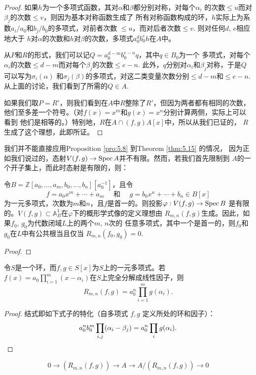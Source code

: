 \begin{proof}
如果$h$为一个多项式函数，其对$\alpha$和$\beta$都分别对称，对每个$\alpha_i$
的次数$\leq u$而对$\beta_j$的次数$\leq v$，则因为基本对称函数生成了
所有对称函数构成的环，$h$实际上为系数$a_i/a_0$和$b_j/b_0$的多项式，对前者次数
$\leq u$，而对后者次数$\leq v$. 则对任何$d$, $e$相应地大于
$h$对$\alpha$的次数和$h$对$\beta$的次数，多项式$a_0^db_0^e h$在$A$中。

从$P$和$R$的形式，我们可以记$Q=a_0^{d-m} b_0^{e-n} q$，其中$q\in B_0$为一个
多项式，对每个$\alpha_i$的次数$\leq d-m$而对每个$\beta_j$的次数$\leq e-n$. 
此外，$q$分别对$\alpha_i$和$\beta_j$对称，于是$Q$可以写为$\sigma_i(\alpha)$
和$\sigma_j(\beta)$的多项式，对这二类变量次数分别$\leq d-m$和$\leq e-n$.
从上面的讨论，我们看到了所需的$Q\in A$.

如果我们取$P=R'$，则我们看到在$A$中$R$整除了$R'$，但因为两者都有相同的次数，
他们至多差一个符号。（对$f(x)=x^m$和$g(x)=x^n$分别计算两侧，实际上可以看到
他们是相等的。）特别地，$R$在$A \cap(f, g) A[x]$中，所以从我们已证的，
$R$生成了这个理想，此即所证。
\end{proof}

我们并不能直接应用Proposition \ref{pro:5.8} 到Theorem \ref{thm:5.15} 的情况，
因为正如我们说过的，态射$V(f,g)\to \operatorname{Spec} A$并不有限。然而，若我们首先限制到
$A$的一个开子集上，而此时态射是有限的，则：

\begin{coro}\label{coro:5.16}
令$B=\mathbb{Z}[a_0, \ldots, a_m, b_0, \ldots, b_n][a_0^{-1}]$，且令
\[
    f=a_0 x^m+\cdots+a_m \quad \text { 和 } \quad g=b_0 x^n+\cdots+b_n \in B[x]
\]
为一元多项式，次数为$m$和$n$，且$f$是首一的。则投影$\varphi:V(f,g)\to \operatorname{Spec} B$
是有限的。$V(f,g)\subset \mathbb A_B^1$在$\varphi$下的概形学式像的定义理想由
$R_{m,n}(f,g)$生成。因此，如果$f_0$, $g_0$为代数闭域$L$上的两个$m$, $n$次的
任意多项式，其中一个是首一的，则$f_0$和$g_0$在$L$中有公共根当且仅当
$R_{m,n}(f_0,g_0)=0$.
\end{coro}

\begin{proof}
    \nottran
\end{proof}


\begin{coro}\label{coro:5.17}
令$S$是一个环，而$f,g\in S[x]$为$S$上的一元多项式。若
$f(x)=a_0 \prod_{i=1}^m(x-\alpha_i)$在$S$上完全分解成线性因子，则
\[
    R_{m, n}(f, g)=a_0^n \prod_{i=1}^m g(\alpha_i).
\]
\end{coro}

\begin{proof}
结式即如下式子的特化（自多项式 $f,g$ 定义所处的环和因子）：
\[
    a_0^n b_0^m \prod_{i, j}(\alpha_i-\beta_j)=a_0^n \prod_i g(\alpha_i).
    \qedhere
\]
\end{proof}


\begin{exa}\label{exa:5.18}
    \nottran
\end{exa}

\begin{exe}\label{exe:5.19}
    \nottran
\[
    0 \to(R_{m, n}(f, g)) \to A \to A /(R_{m, n}(f, g)) \to 0
\]
\end{exe}

\begin{exe}\label{exe:5.20}
    \nottran
\end{exe}
